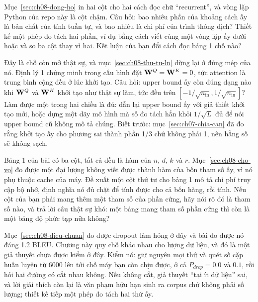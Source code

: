 \begin{bt}
  \item Mục~\ref{sec:ch08-dong-ho} in hai cột cho hai cách đọc chữ
    \enquote{recurrent}, và vòng lặp Python của repo này là cột chậm. Câu hỏi:
    bao nhiêu phần của khoảng cách ấy là bản chất của tính tuần tự, và bao nhiêu
    là chi phí của trình thông dịch? Thiết kế một phép đo tách hai phần, ví dụ
    bằng cách viết cùng một vòng lặp ấy dưới  hoặc
     và so ba cột thay vì hai. Kết luận của bạn đổi cách
    đọc bảng 1 chỗ nào?

  \item Đây là chỗ còn mở thật sự, và mục~\ref{sec:ch08-thu-tu-ln} dừng lại ở
    đúng mép của nó. Định lý 1 chứng minh trong cấu hình đặt
    \(\mathbf{W}^Q = \mathbf{W}^K = 0\), tức attention là trung bình cộng đều ở lúc
    khởi tạo. Câu hỏi: upper bound ấy còn đúng dạng nào khi \(\mathbf{W}^Q\) và
    \(\mathbf{W}^K\) khởi tạo như  thật sự làm, tức đều trên
    \([-1/\sqrt{n_{\mathrm{in}}}, 1/\sqrt{n_{\mathrm{in}}}]\)? Làm được một
    trong hai chiều là đủ: dẫn lại upper bound ấy với giả thiết khởi tạo mới,
    hoặc dựng một dãy mô hình mà số đo tách hẳn khỏi \(1/\sqrt{L}\) đủ để nói
    upper bound cũ không mô tả chúng. Biết trước: mục~\ref{sec:ch07-chia-can} đã đo rằng khởi tạo ấy cho
    phương sai thành phần 1/3 chứ không phải 1, nên hằng số sẽ không sạch.

  \item Bảng 1 của bài có ba cột, tất cả đều là hàm của \(n\), \(d\), \(k\) và
    \(r\). Mục~\ref{sec:ch08-cho-vo} đo được một đại lượng không viết được thành
    hàm của bốn tham số ấy, vì nó phụ thuộc cache của máy. Đề xuất một cột thứ
    tư cho bảng 1 mô tả chi phí truy cập bộ nhớ, định nghĩa nó đủ chặt để tính
    được cho cả bốn hàng, rồi tính. Nếu cột của bạn phải mang thêm một tham số
    của phần cứng, hãy nói rõ đó là tham số nào, và trả lời câu thật sự khó:
    một bảng  mang tham số phần cứng thì còn là một
    bảng độ phức tạp
    nữa không?

  \item Mục~\ref{sec:ch08-dieu-chuan} đo được dropout làm hỏng ở đây và bài đo
    được nó đáng 1.2 BLEU. Chương này quy chỗ khác nhau cho lượng dữ liệu, và
    đó là một giả thuyết chưa được kiểm ở đây. Kiểm nó: giữ nguyên mọi thứ và
    quét số cặp huấn luyện từ 6000 lên tới chỗ máy bạn còn chịu được, ở cả
    \(P_{drop} = 0.0\) và \(0.1\), rồi hỏi hai đường có cắt nhau không. Nếu
    không cắt, giả thuyết \enquote{tại ít dữ liệu} sai, và lời giải thích còn
    lại là văn phạm hữu hạn sinh ra corpus chứ không phải số lượng; thiết kế
    tiếp một phép đo tách hai thứ ấy.
\end{bt}
